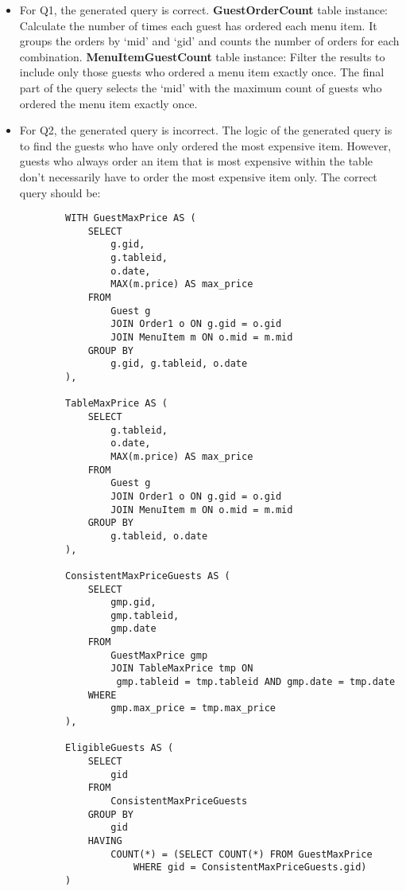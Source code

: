 \documentclass{article}
\begin{document}
\begin{itemize}
    \item For Q1, the generated query is correct. 
    \subitem \textbf{GuestOrderCount} table instance:  Calculate the number of times each guest has ordered each menu item. It groups the orders by `mid' and `gid' and counts the number of orders for each combination.
    \subitem \textbf{MenuItemGuestCount} table instance: Filter the results to include only those guests who ordered a menu item exactly once.
    \subitem The final part of the query selects the `mid' with the maximum count of guests who ordered the menu item exactly once.
    \item For Q2, the generated query is incorrect. The logic of the generated query is 
    to find the guests who have only ordered the most expensive item. However, guests who 
    always order an item that is most expensive within the table don't necessarily have to 
    order the most expensive item only. The correct query should be:
    \begin{verbatim}
        WITH GuestMaxPrice AS (
            SELECT 
                g.gid,
                g.tableid,
                o.date,
                MAX(m.price) AS max_price
            FROM 
                Guest g
                JOIN Order1 o ON g.gid = o.gid
                JOIN MenuItem m ON o.mid = m.mid
            GROUP BY 
                g.gid, g.tableid, o.date
        ),

        TableMaxPrice AS (
            SELECT 
                g.tableid,
                o.date,
                MAX(m.price) AS max_price
            FROM 
                Guest g
                JOIN Order1 o ON g.gid = o.gid
                JOIN MenuItem m ON o.mid = m.mid
            GROUP BY 
                g.tableid, o.date
        ),

        ConsistentMaxPriceGuests AS (
            SELECT 
                gmp.gid,
                gmp.tableid,
                gmp.date
            FROM 
                GuestMaxPrice gmp
                JOIN TableMaxPrice tmp ON 
                 gmp.tableid = tmp.tableid AND gmp.date = tmp.date
            WHERE 
                gmp.max_price = tmp.max_price
        ),

        EligibleGuests AS (
            SELECT 
                gid
            FROM 
                ConsistentMaxPriceGuests
            GROUP BY 
                gid
            HAVING 
                COUNT(*) = (SELECT COUNT(*) FROM GuestMaxPrice 
                    WHERE gid = ConsistentMaxPriceGuests.gid)
        )


\end{verbatim}
\end{itemize}
\end{document}
